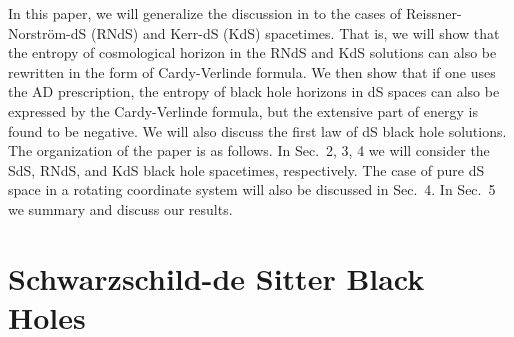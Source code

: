 \documentclass[a4paper,12pt]{article}
\newcommand{\sect}[1]{\setcounter{equation}{0}\section{#1}}
\begin{document}
In this paper, we will generalize the discussion in \cite{Cai1} to the cases of 
Reissner-Norstr\"om-dS (RNdS) and Kerr-dS (KdS) spacetimes. That is, we will show that the 
entropy of cosmological horizon in the RNdS and KdS solutions can also be rewritten in the form
of Cardy-Verlinde formula.  We then show that if one uses the AD prescription, the entropy of 
black hole horizons in dS spaces can also be expressed by the Cardy-Verlinde formula, but the 
extensive part of energy is found to be negative. We will also discuss the first law of dS 
black hole solutions. The organization of the paper is as follows. In Sec.~2, 3, 4 we will 
consider the SdS, RNdS, and KdS black hole spacetimes, respectively. The case of pure dS space
in a rotating coordinate system  will also be discussed in Sec.~4.
In Sec.~5 we summary  and discuss our results. 
 


\sect{Schwarzschild-de Sitter Black Holes }
\end{document}
